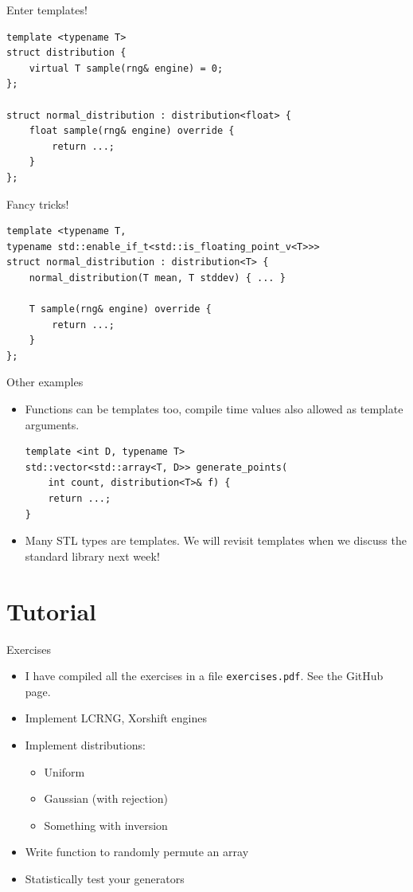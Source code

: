 \documentclass[10pt]{beamer}
\begin{document}
\begin{frame}[fragile,label={sec:org3218ec4}]{Enter templates!}
 \begin{verbatim}
template <typename T> 
struct distribution {
    virtual T sample(rng& engine) = 0;
};

struct normal_distribution : distribution<float> {
    float sample(rng& engine) override {
        return ...;
    }
};
\end{verbatim}
\end{frame}

\begin{frame}[fragile,label={sec:org9ed70db}]{Fancy tricks!}
 \begin{verbatim}
template <typename T,
typename std::enable_if_t<std::is_floating_point_v<T>>>
struct normal_distribution : distribution<T> {
    normal_distribution(T mean, T stddev) { ... }

    T sample(rng& engine) override {
        return ...;
    }
};
\end{verbatim}
\end{frame}
\begin{frame}[fragile,label={sec:org50b0207}]{Other examples}
 \begin{itemize}
\item Functions can be templates too, compile time values also allowed as \alert{template arguments}.
\begin{verbatim}
template <int D, typename T>
std::vector<std::array<T, D>> generate_points(
    int count, distribution<T>& f) {
    return ...;
}
\end{verbatim}
\item Many STL types are templates. We will revisit templates when we discuss the standard library next week!
\end{itemize}
\end{frame}
\section{Tutorial}
\label{sec:org0c64ab9}
\begin{frame}[fragile,label={sec:orgbd49939}]{Exercises}
 \begin{itemize}
\item I have compiled all the exercises in a file \texttt{exercises.pdf}. See the GitHub
page.
\item Implement LCRNG, Xorshift engines
\item Implement distributions:
\begin{itemize}
\item Uniform
\item Gaussian (with rejection)
\item Something with inversion
\end{itemize}
\item Write function to randomly permute an array
\item Statistically test your generators
\end{itemize}
\end{frame}
\end{document}
